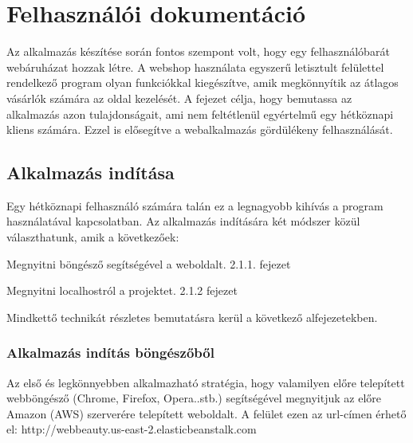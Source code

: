 \chapter{Felhasználói dokumentáció} %
\label{ch:user}

Az alkalmazás készítése során fontos szempont volt, hogy egy felhasználóbarát webáruházat hozzak létre. A webshop használata egyszerű letisztult felülettel rendelkező program olyan funkciókkal kiegészítve, amik megkönnyítik az átlagos vásárlók számára az oldal kezelését. A fejezet célja, hogy bemutassa az alkalmazás azon tulajdonságait, ami nem feltétlenül egyértelmű egy hétköznapi kliens számára. Ezzel is elősegítve a webalkalmazás gördülékeny felhasználását.


\section{Alkalmazás indítása} %

Egy hétköznapi felhasználó számára talán ez a legnagyobb kihívás a program használatával kapcsolatban. Az alkalmazás indítására két módszer közül választhatunk, amik a következőek:

\begin{compactenum}
	\item Megnyitni böngésző segítségével a weboldalt. 2.1.1. fejezet
	\item Megnyitni localhostról a projektet. 2.1.2 fejezet
\end{compactenum}

\bigskip
Mindkettő technikát részletes bemutatásra kerül a következő alfejezetekben.

\subsection{Alkalmazás indítás böngészőből}
Az első és legkönnyebben alkalmazható stratégia, hogy valamilyen előre telepített webböngésző (Chrome, Firefox, Opera..stb.) segítségével megnyitjuk az előre Amazon (AWS) szerverére telepített weboldalt. A felület ezen az url-címen érhető el: http://webbeauty.us-east-2.elasticbeanstalk.com

